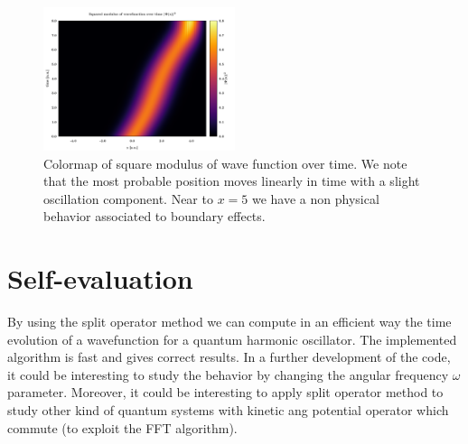 \documentclass[rmp,10pt,onecolumn,fleqn,notitlepage]{revtex4-1}
\begin{document}
\begin{figure}[h!]
\centering
\includegraphics[width=0.5\textwidth]{image/color_map.pdf}
\caption{\label{fig:result_cmap} Colormap of square modulus of wave function over time. We note that the most probable position moves linearly in time with a slight oscillation component. Near to \( x=5 \) we have a non physical behavior associated to boundary effects.}
\end{figure}




\section{Self-evaluation}
By using the split operator method we can compute in an efficient way the time evolution of a wavefunction for a quantum harmonic oscillator. The implemented algorithm is fast and gives correct results. In a further development of the code, it could be interesting to study the behavior by changing the angular frequency \( \omega  \) parameter. Moreover, it could be interesting to apply split operator method to study other kind of quantum systems with kinetic ang potential operator which commute (to exploit the FFT algorithm).
\end{document}
